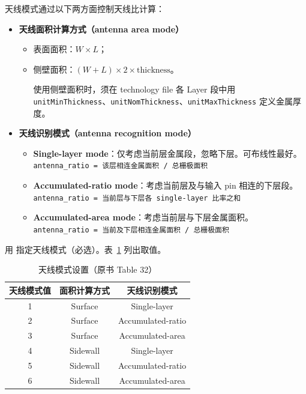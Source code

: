 天线模式通过以下两方面控制天线比计算：
\begin{itemize}
  \item \textbf{天线面积计算方式（antenna area mode）}
  \begin{itemize}
    \item 表面面积：\(W \times L\)；
    \item 侧壁面积：\((W+L)\times 2\times\text{thickness}\)。
\begin{noteBox}
使用侧壁面积时，须在 technology file 各 Layer 段中用 \texttt{unitMinThickness}、\texttt{unitNomThickness}、\texttt{unitMaxThickness} 定义金属厚度。
\end{noteBox}
  \end{itemize}
  \item \textbf{天线识别模式（antenna recognition mode）}
  \begin{itemize}
    \item \textbf{Single-layer mode}：仅考虑当前层金属段，忽略下层。可布线性最好。\\
          \texttt{antenna\_ratio = 该层相连金属面积 / 总栅极面积}
    \item \textbf{Accumulated-ratio mode}：考虑当前层及与输入 pin 相连的下层段。\\
          \texttt{antenna\_ratio = 当前层与下层各 single-layer 比率之和}
    \item \textbf{Accumulated-area mode}：考虑当前层与下层金属面积。\\
          \texttt{antenna\_ratio = 当前及下层相连金属面积 / 总栅极面积}
  \end{itemize}
\end{itemize}

用  指定天线模式（必选）。表~\ref{tab:antenna-mode} 列出取值。

\begin{table}[htbp]
\centering
\caption{天线模式设置（原书 Table 32）}
\label{tab:antenna-mode}
\begin{tabular}{@{}ccc@{}}
\toprule
天线模式值 & 面积计算方式 & 天线识别模式 \\
\midrule
1 & Surface & Single-layer \\
2 & Surface & Accumulated-ratio \\
3 & Surface & Accumulated-area \\
4 & Sidewall & Single-layer \\
5 & Sidewall & Accumulated-ratio \\
6 & Sidewall & Accumulated-area \\
\bottomrule
\end{tabular}
\end{table}

